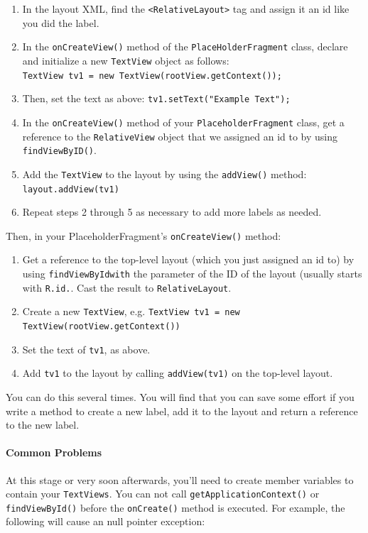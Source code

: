 \documentclass[10pt]{article}
\begin{document}
\begin{enumerate}
\item In the layout XML, find the \texttt{<RelativeLayout>} tag and assign it an id like you did the label.
\item In the \texttt{onCreateView()} method of the \texttt{PlaceHolderFragment} class, declare and initialize a new \texttt{TextView} object as follows:\\
    \texttt{TextView tv1 = new TextView(rootView.getContext());}
\item Then, set the text as above: \texttt{tv1.setText("Example Text");}
\item In the \texttt{onCreateView()} method of your \texttt{PlaceholderFragment} class, get a reference to the \texttt{RelativeView} object that we assigned an id to by using \texttt{findViewByID()}.
\item Add the \texttt{TextView} to the layout by using the \texttt{addView()} method:
    \texttt{layout.addView(tv1)}
\item Repeat steps 2 through 5 as necessary to add more labels as needed.
\end{enumerate}

Then, in your PlaceholderFragment's {\tt onCreateView()} method:
\begin{enumerate}
\item Get a reference to the top-level layout (which you just assigned an id to) by using \texttt{findViewByIdwith} the parameter of the ID of the layout (usually starts with \texttt{R.id.}. Cast the result to \texttt{RelativeLayout}.
\item Create a new \texttt{TextView}, e.g. \texttt{TextView tv1 = new TextView(rootView.getContext())}
\item Set the text of \texttt{tv1}, as above.
\item Add \texttt{tv1} to the layout by calling \texttt{addView(tv1)} on the top-level layout.
\end{enumerate}

You can do this several times. You will find that you can save some effort if you write a method to create a new label, add it to the layout and return a reference to the new label.

\paragraph{Common Problems}
At this stage or very soon afterwards, you'll need to create member variables to contain your {\tt TextViews}. You can not call {\tt getApplicationContext()} or {\tt findViewById()} before the {\tt onCreate()} method is executed. For example, the following will cause an null pointer exception:
\end{document}
